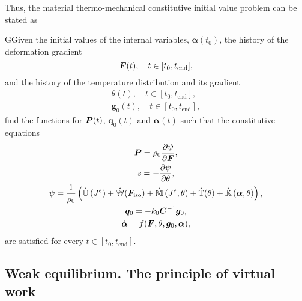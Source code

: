 Thus, the material thermo-mechanical constitutive initial value problem can be stated as
    \begin{problem}
    GGiven the initial values of the internal variables, $\bm \alpha(t_0)$, the history of the deformation gradient
    \begin{equation}
        \bm{F}(t),\quad t\in[t_0,t_\text{end}],
    \end{equation}
    and the history of the temperature distribution and its gradient
    \begin{gather}
    \theta(t),\quad t\in[t_0,t_\text{end}],\\
    \bm g_0(t), \quad t\in[t_0, t_\text{end}],
    \end{gather}
    find the functions for $\bm{P}(t)$, \(\bm q_0(t)\) and $\bm \alpha(t)$ such that the constitutive equations
    \begin{gather}
        \bm{P} = \rho_0 \frac{\partial \psi}{\partial \bm{F}},\\
        s = -\frac{\partial \psi}{\partial \theta},\\
        \psi =\frac{1}{\rho_0}\left( \hat{\mathbb{U}}\left(J^{e}\right)+\hat{\mathbb{W}}(\bm F_\text{iso})+\hat{\mathbb{M}}\left(J^{e}, \theta\right)+\hat{\mathbb{T}}(\theta)+\hat{\mathbb{K}}\left(\boldsymbol{\alpha}, \theta\right)\right),\\
        \bm q_0 = - k_0 \bm C^{-1} \bm g_0,\\
        \dot{\bm \alpha} = f(\bm{F}, \theta, \bm g_0 ,\bm \alpha),
    \end{gather}
    are satisfied for every $t\in [t_0, t_\text{end}]$.
    \end{problem}

\subsection{Weak equilibrium. The principle of virtual work}

